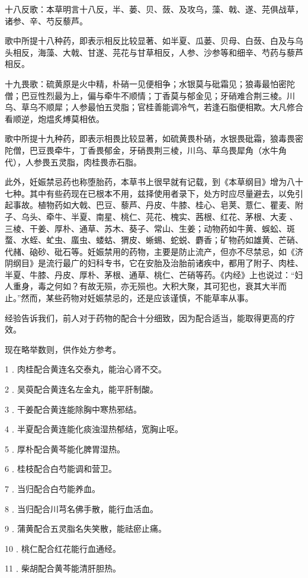 \documentclass[a4paper,12pt,UTF8,twoside]{ctexbook}
\begin{document}
十八反歌：本草明言十八反，半、蒌、贝、蔹、及攻乌，藻、戟、遂、芫俱战草，诸参、辛、芍反藜芦。

歌中所提十八种药，即表示相反比较显著、如半夏、瓜蒌、贝母、白蔹、白及与乌头相反，海藻、大戟、甘遂、芫花与甘草相反，人参、沙参等和细辛、芍药与藜芦相反。

十九畏歌：硫黄原是火中精，朴硝一见便相争；水银莫与砒霜见；狼毒最怕密陀僧；巴豆性烈最为上，偏与牵牛不顺情；丁香莫与郁金见；牙硝难合荆三棱。川乌、草乌不顺犀；人参最怕五灵脂；官桂善能调冷气，若逢石脂便相欺。大凡修合看顺逆，炮煴炙煿莫相依。

歌中所提十九种药，即表示相畏比较显著，如硫黄畏朴硝，水银畏砒霜，狼毒畏密陀僧，巴豆畏牵牛，丁香畏郁金，牙硝畏荆三棱，川乌、草乌畏犀角（水牛角代），人参畏五灵脂，肉桂畏赤石脂。

此外，妊娠禁忌药也称堕胎药，本草书上很早就有记载，到《本草纲目》增为八十七种。其中有些药现在已根本不用，兹择使用者录下，处方时应尽量避去，以免引起事故。植物药如大戟、巴豆、藜芦、丹皮、牛膝、桂心、皂荚、薏仁、瞿麦、附子、乌头、牵牛、半夏、南星、桃仁、芫花、槐实、茜根、红花、茅根、大麦
、三棱、干姜、厚朴、通草、苏木、葵子、常山、生姜；动物药如牛黄、蜈蚣、斑蝥、水蛭、虻虫、䗪虫、蝼蛄、猬皮、蜥蜴、蛇蜕、麝香；矿物药如雄黄、芒硝、代赭、硇砂、砒石等。妊娠禁用的药物，主要是防止流产，但亦不尽禁忌，如《济阴纲目》是流行最广的妇科专书，它在安胎及治胎前诸疾中，都用了附子、肉桂、半夏、牛膝、丹皮、厚朴、茅根、通草、桃仁、芒硝等药。《内经》上也说过：“妇人重身，毒之何如？有故无殒，亦无殒也。大积大聚，其可犯也，衰其大半而止。”然而，某些药物对妊娠禁忌的，还是应该谨慎，不能草率从事。

经验告诉我们，前人对于药物的配合十分细致，因为配合适当，能取得更高的疗效。

现在略举数则，供作处方参考。

1﹒肉桂配合黄连名交泰丸，能治心肾不交。

2﹒吴萸配合黄连名左金丸，能平肝制酸。

3﹒干姜配合黄连能除胸中寒热邪结。

4﹒半夏配合黄连能化痰浊湿热郁结，宽胸止呕。

5﹒厚朴配合黄芩能化脾胃湿热。

6﹒桂枝配合白芍能调和营卫。

7﹒当归配合白芍能养血。

8﹒当归配合川芎名佛手散，能行血活血。

9﹒蒲黄配合五灵脂名失笑散，能祛瘀止痛。

10﹒桃仁配合红花能行血通经。

11﹒柴胡配合黄芩能清肝胆热。
\end{document}
